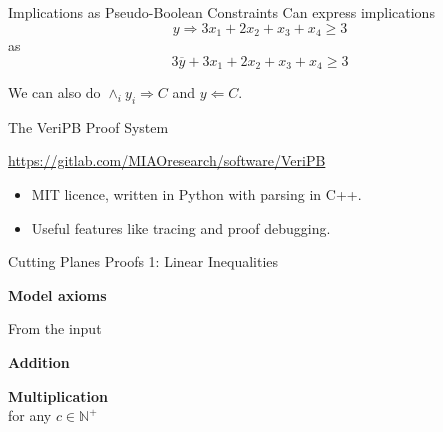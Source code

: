 \documentclass[aspectratio=169,compress,10pt]{beamer}
\begin{document}
\begin{frame}{Implications as Pseudo-Boolean Constraints}
    Can express implications
    \begin{equation*} y \Rightarrow 3x_1 + 2x_2 + x_3 + x_4 \ge 3 \end{equation*}
    as
    \begin{equation*}
    3\overline{y} + 3x_1 + 2x_2 + x_3 + x_4 \ge 3
    \end{equation*}

    \bigskip

    We can also do $\land_i y_i \Rightarrow C$ and $y \Leftarrow C$.
\end{frame}

\begin{frame}{The VeriPB Proof System}
    \begin{center}
        \url{https://gitlab.com/MIAOresearch/software/VeriPB} \\
        \bigskip
    \end{center}
    \begin{itemize}
        \item MIT licence, written in Python with parsing in C++.
        \item Useful features like tracing and proof debugging.
    \end{itemize}
\end{frame}

\begin{frame}{Cutting Planes Proofs 1: Linear Inequalities}
    \begin{minipage}[c]{0.35\framewidth}
        \textcolor{uofgcobalt}{\textbf{Model axioms}}
    \end{minipage}\hfill\begin{minipage}[c]{0.60\framewidth}
        \centering From the input
    \end{minipage}\bigskip

    \begin{minipage}[c]{0.35\framewidth}
        \textcolor{uofgcobalt}{\textbf{Addition}}
    \end{minipage}\hfill\begin{minipage}[c]{0.60\framewidth}\begin{prooftree}
    \end{prooftree}\end{minipage}\bigskip

    \begin{minipage}[c]{0.35\framewidth}
        \textcolor{uofgcobalt}{\textbf{Multiplication}}\\
        for any $c \in \mathbb{N^+}$
    \end{minipage}\hfill\begin{minipage}[c]{0.60\framewidth}\begin{prooftree}
    \end{prooftree}\end{minipage}
\end{frame}
\end{document}

